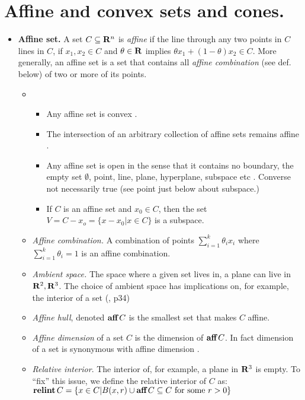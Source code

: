 \documentclass[a4paper, oneside]{book}
\begin{document}
\section{Affine and convex sets and cones.}
\begin{itemize}
	\item \textbf{Affine set.}  A set $C \subseteq	 \mathbf R^n$ is \textit{affine} if the line through any two points in $C$ lines in $C$, \ie if $x_1, x_2 \in C$ and $\theta \in \mathbf R$ implies $\theta x_1 + (1-\theta) x_2 \in C$.  More generally, an affine set is a set that contains all \textit{affine combination} (see def. below) of two or more of its points.
	\begin{itemize}
\item 	
		\begin{itemize}
		\item Any affine set is convex \cite{dattorro10}.
		\item The intersection of an arbitrary collection of affine sets remains affine \cite{dattorro10}.
		\item Any affine set is open in the sense that it contains no boundary, \eg the empty set $\emptyset$, point, line, plane, hyperplane, subspace etc \cite{dattorro10}. Converse not necessarily true (\eg see point just below about subspace.)
		\item If $C$ is an affine set and $x_0 \in C$, then the set $V=C-x_o = \{x-x_0 | x\in C\}$ is a subspace.
 		\end{itemize}
	\item \textit{Affine combination.} A combination of points $\sum_{i=1}^k \theta_i x_i$ where $\sum_{i=1}^k\theta_i = 1$ is an affine combination.
	\item \textit{Ambient space.} The space where a given set lives in, \eg a plane can live in $\mathbf R^2, \mathbf R^3$. The choice of ambient space has implications on, for example, the interior of a set (\cite{dattorro10}, p34)
	\item \textit{Affine hull}, denoted $\textbf{aff}\,C$ is the smallest set that makes $C$ affine.
	\item \textit{Affine dimension} of a set $C$ is the dimension of $\textbf{aff}\,C$. In fact dimension of a set is synonymous with affine dimension \cite{dattorro10}.
	\item \textit{Relative interior}. The interior of, for example, a plane in $\mathbf R^3$ is empty. To ``fix'' this issue, we define the relative interior of $C$ as: $\textbf{relint}\,C = \{x \in C | B(x,r) \cup \textbf{aff}\,C \subseteq C\text{ for some }r>0\}$

\end{itemize}
\end{itemize}
\end{document}
